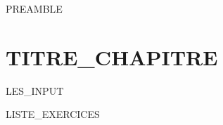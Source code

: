 
PREAMBLE





\setcounter{chapter}{N_CHAPITRE}

\chapter{TITRE_CHAPITRE}
LES_INPUT

\newpage

\thispagestyle{empty}

\renewcommand{\thesection}{\arabic{section}}

\renewcommand{\cite}[1]{}           %


LISTE_EXERCICES



